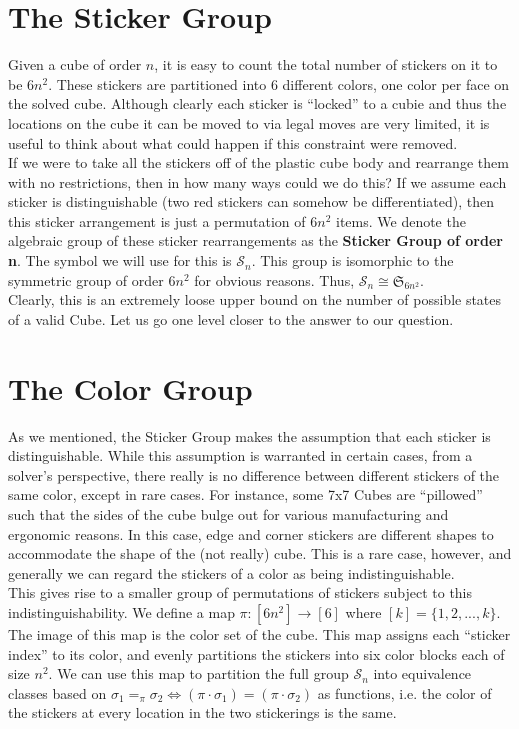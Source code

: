 \documentclass[10pt,letterpaper]{report}
\begin{document}
\section{The Sticker Group}
Given a cube of order $n$, it is easy to count the total number of stickers on it to be $6n^2$.  These stickers are partitioned into 6 different colors, one color per face on the solved cube.  Although clearly each sticker is ``locked'' to a cubie and thus the locations on the cube it can be moved to via legal moves are very limited, it is useful to think about what could happen if this constraint were removed. \\

If we were to take all the stickers off of the plastic cube body and rearrange them with no restrictions, then in how many ways could we do this?  If we assume each sticker is distinguishable (two red stickers can somehow be differentiated), then this sticker arrangement is just a permutation of $6n^2$ items.  We denote the algebraic group of these sticker rearrangements as the \textbf{Sticker Group of order n}.  The symbol we will use for this is $\mathcal{S}_n$.  This group is isomorphic to the symmetric group of order $6n^2$ for obvious reasons.  Thus, $\mathcal{S}_n \cong \mathfrak{S}_{6n^2}$. \\

Clearly, this is an extremely loose upper bound on the number of possible states of a valid Cube.  Let us go one level closer to the answer to our question.

\section{The Color Group}
As we mentioned, the Sticker Group makes the assumption that each sticker is distinguishable.  While this assumption is warranted in certain cases, from a solver's perspective, there really is no difference between different stickers of the same color, except in rare cases.  For instance, some 7x7 Cubes are ``pillowed'' such that the sides of the cube bulge out for various manufacturing and ergonomic reasons.  In this case, edge and corner stickers are different shapes to accommodate the shape of the (not really) cube.  This is a rare case, however, and generally we can regard the stickers of a color as being indistinguishable.\\

This gives rise to a smaller group of permutations of stickers subject to this indistinguishability.  We define a map $\pi : [6n^2] \rightarrow [6]$ where $[k] = \{1,2,...,k\}$.  The image of this map is the color set of the cube.  This map assigns each ``sticker index'' to its color, and evenly partitions the stickers into six color blocks each of size $n^2$.  We can use this map to partition the full group $\mathcal{S}_n$ into equivalence classes based on $\sigma_1 =_\pi \sigma_2 \iff (\pi \cdot \sigma_1) = (\pi \cdot \sigma_2)$ as functions, i.e. the color of the stickers at every location in the two stickerings  is the same. \\
\end{document}
